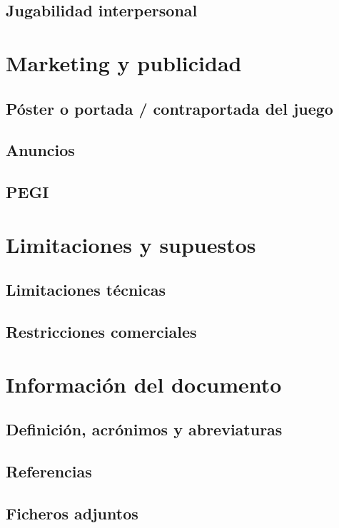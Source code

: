 \subsection{Jugabilidad interpersonal}

\section{Marketing y publicidad}
\subsection{Póster o portada / contraportada del juego}
\subsection{Anuncios}
\subsection{PEGI}


\section{Limitaciones y supuestos}
\subsection{Limitaciones técnicas}
\subsection{Restricciones comerciales}


\section{Información del documento}
\subsection{Definición, acrónimos y abreviaturas}
\subsection{Referencias}
\subsection{Ficheros adjuntos}

\chapterend
